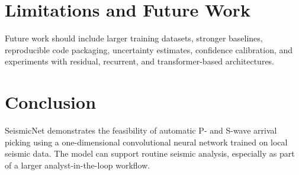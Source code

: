 \documentclass[11pt]{article}
\begin{document}
\section{Limitations and Future Work}
Future work should include larger training datasets, stronger baselines, reproducible code packaging, uncertainty estimates, confidence calibration, and experiments with residual, recurrent, and transformer-based architectures.

\section{Conclusion}
SeismicNet demonstrates the feasibility of automatic P- and S-wave arrival picking using a one-dimensional convolutional neural network trained on local seismic data. The model can support routine seismic analysis, especially as part of a larger analyst-in-the-loop workflow.



\end{document}
